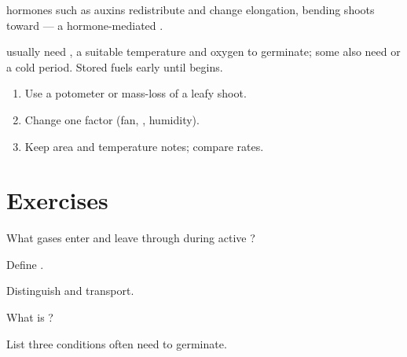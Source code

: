 \begin{example}\label{ex:g9:plant-phys:auxin}
 hormones such as auxins redistribute and change  elongation,
bending shoots toward  --- a hormone-mediated .
\end{example}

\begin{definition}\label{def:g9:plant-phys:germ}
 usually need , a suitable temperature and oxygen to germinate;
some also need  or a cold period. Stored  fuels early 
until  begins.
\end{definition}

\begin{method}\label{met:g9:plant-phys:potom}
\begin{enumerate}
  \item Use a potometer or mass-loss of a leafy shoot.
  \item Change one factor (fan, , humidity).
  \item Keep  area and temperature notes; compare rates.
\end{enumerate}
\end{method}

\section{Exercises}

\begin{exercise}[$\star$]\label{exo:g9:plant-phys:1}
What gases enter and leave  through  during active
?
\end{exercise}

\begin{exercise}[$\star$]\label{exo:g9:plant-phys:2}
Define .
\end{exercise}

\begin{exercise}[$\star$]\label{exo:g9:plant-phys:3}
Distinguish  and  transport.
\end{exercise}

\begin{exercise}[$\star$]\label{exo:g9:plant-phys:4}
What is ?
\end{exercise}

\begin{exercise}[$\star$]\label{exo:g9:plant-phys:5}
List three conditions  often need to germinate.
\end{exercise}

